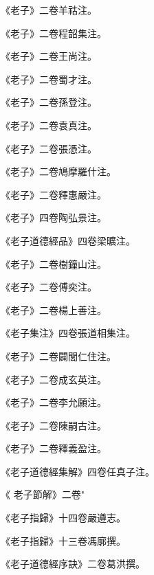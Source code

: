 \begin{pinyinscope}
 《老子》二卷羊祜注。



 《老子》二卷程韶集注。



 《老子》二卷王尚注。



 《老子》二卷蜀才注。



 《老子》二卷孫登注。



 《老子》二卷袁真注。



 《老子》二卷張憑注。



 《老子》二卷鳩摩羅什注。



 《老子》二卷釋惠嚴注。



 《老子》四卷陶弘景注。



 《老子道德經品》四卷梁曠注。



 《老子》二卷樹鐘山注。



 《老子》二卷傅奕注。



 《老子》二卷楊上善注。



 《老子集注》四卷張道相集注。



 《老子》二卷闢閭仁住注。



 《老子》二卷成玄英注。



 《老子》二卷李允願注。



 《老子》二卷陳嗣古注。



 《老子》二卷釋義盈注。



 《老子道德經集解》四卷任真子注。



 《
 老子節解》二卷"



 《老子指歸》十四卷嚴遵志。



 《老子指歸》十三卷馮廓撰。



 《老子道德經序訣》二卷葛洪撰。




\end{pinyinscope}
